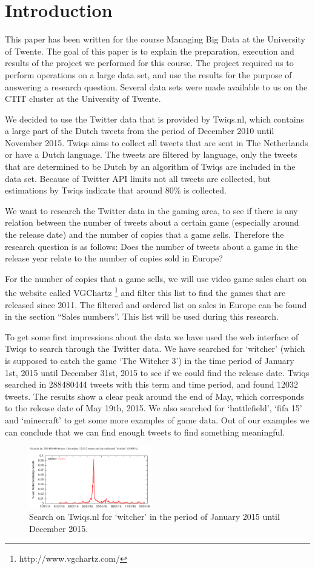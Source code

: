 \section{Introduction}
This paper has been written for the course Managing Big Data at the University of Twente. The goal of this paper is to explain the preparation, execution and results of the project we performed for this course. The project required us to perform operations on a large data set, and use the results for the purpose of answering a research question. Several data sets were made available to us on the CTIT cluster at the University of Twente. 

We decided to use the Twitter data that is provided by Twiqs.nl, which contains a large part of the Dutch tweets from the period of December 2010 until November 2015. Twiqs aims to collect all tweets that are sent in The Netherlands or have a Dutch language. The tweets are filtered by language, only the tweets that are determined to be Dutch by an algorithm of Twiqs are included in the data set. Because of Twitter API limits not all tweets are collected, but estimations by Twiqs indicate that around 80\% is collected.

We want to research the Twitter data in the gaming area, to see if there is any relation between the number of tweets about a certain game (especially around the release date) and the number of copies that a game sells. Therefore the research question is as follows:
Does the number of tweets about a game in the release year relate to the number of copies sold in Europe?

For the number of copies that a game sells, we will use video game sales chart on  the website called VGChartz \footnote{http://www.vgchartz.com/} and filter this list to find the games that are released since 2011. The filtered and ordered list on sales in Europe can be found in the section “Sales numbers”. This list will be used during this research.

To get some first impressions about the data we have used the web interface of Twiqs to search through the Twitter data. We have searched for ‘witcher’ (which is supposed to catch the game ‘The Witcher 3’) in the time period of January 1st, 2015 until December 31st, 2015 to see if we could find the release date. Twiqs searched in 288480444 tweets with this term and time period, and found 12032 tweets. The results show a clear peak around the end of May, which corresponds to the release date of May 19th, 2015. We also searched for ‘battlefield’, ‘fifa 15’ and ‘minecraft’ to get some more examples of game data. Out of our examples we can conclude that we can find enough tweets to find something meaningful.
\begin{figure}[!ht]
	\centering
		\includegraphics[width=0.476\textwidth]{twiqswitcher}
	\caption{Search on Twiqs.nl for ‘witcher’ in the period of January 2015 until December 2015.}
\end{figure}
